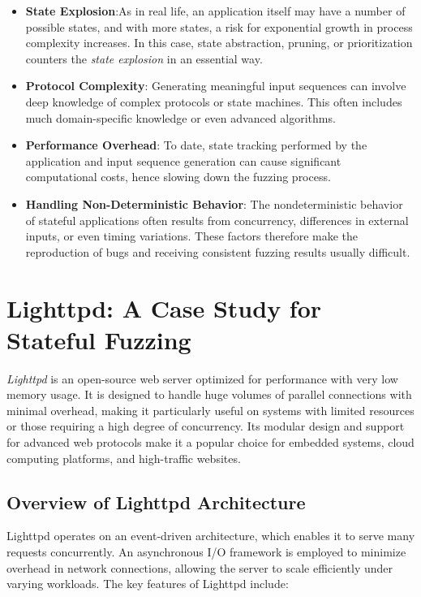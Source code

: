 \begin{itemize}
    \item \textbf{State Explosion}:As in real life, an application itself may have a number of possible states, and with more states, a risk for exponential growth in process complexity increases. In this case, state abstraction, pruning, or prioritization counters the \textit{state explosion} in an essential way.
    
    \item \textbf{Protocol Complexity}: Generating meaningful input sequences can involve deep knowledge of complex protocols or state machines. This often includes much domain-specific knowledge or even advanced algorithms.
    
    \item \textbf{Performance Overhead}: To date, state tracking performed by the application and input sequence generation can cause significant computational costs, hence slowing down the fuzzing process.

    \item \textbf{Handling Non-Deterministic Behavior}: The nondeterministic behavior of stateful applications often results from concurrency, differences in external inputs, or even timing variations. These factors therefore make the reproduction of bugs and receiving consistent fuzzing results usually difficult.

\end{itemize}

\section{Lighttpd: A Case Study for Stateful Fuzzing}
\textit{Lighttpd} is an open-source web server optimized for performance with very low memory usage. It is designed to handle huge volumes of parallel connections with minimal overhead, making it particularly useful on systems with limited resources or those requiring a high degree of concurrency. Its modular design and support for advanced web protocols make it a popular choice for embedded systems, cloud computing platforms, and high-traffic websites.

\subsection{Overview of Lighttpd Architecture}
Lighttpd operates on an event-driven architecture, which enables it to serve many requests concurrently. An asynchronous I/O framework is employed to minimize overhead in network connections, allowing the server to scale efficiently under varying workloads. The key features of Lighttpd include:

